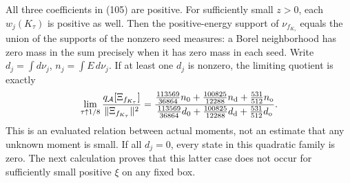 \documentclass[11pt]{article}
\begin{document}
All three coefficients in (105) are positive.
For sufficiently small $z>0$, each $w_j(K_\tau)$ is positive as well.
Then the positive-energy support of $\nu_{f_{K_\tau}}$ equals the union
of the supports of the nonzero seed measures: a Borel neighborhood
has zero mass in the sum precisely when it has zero mass in each seed.
Write $d_j=\int d\nu_j$, $n_j=\int E\,d\nu_j$.
If at least one $d_j$ is nonzero, the limiting quotient is exactly
\begin{equation}\label{eq:fabel-tensor-limit-quotient}
 \lim_{\tau\uparrow1/8}
 \frac{q_{\mathcal A}[\Xi_{f_{K_\tau}}]}{\|\Xi_{f_{K_\tau}}\|^2}
 =
 \frac{\frac{113569}{36864}n_0+
       \frac{100825}{12288}n_{\rm d}+\frac{531}{512}n_{\rm o}}
      {\frac{113569}{36864}d_0+
       \frac{100825}{12288}d_{\rm d}+\frac{531}{512}d_{\rm o}} .
\end{equation}
This is an evaluated relation between actual moments, not an estimate
that any unknown moment is small. If all $d_j=0$, every state in this
quadratic family is zero. The next calculation proves that this latter
case does not occur for sufficiently small positive $\xi$ on any fixed box.
\end{document}
